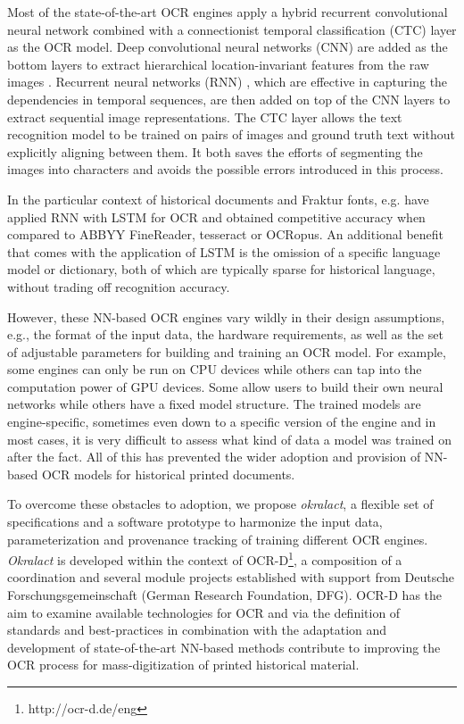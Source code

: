 \documentclass[conference]{IEEEtran}
\begin{document}
Most of the state-of-the-art OCR engines apply a hybrid recurrent convolutional
neural network combined with a connectionist temporal classification (CTC)
\cite{graves2006connectionist} layer as the OCR model. Deep convolutional
neural networks (CNN) \cite{krizhevsky2012imagenet} are added as the bottom
layers to extract hierarchical location-invariant features from the raw images
\cite{wick2018improving}. Recurrent neural networks (RNN)
\cite{mikolov2010recurrent}, which are effective in capturing the dependencies
in temporal sequences, are then added on top of the CNN layers to extract
sequential image representations. The CTC layer allows the text recognition
model to be trained on pairs of images and ground truth text without explicitly
aligning between them. It both saves the efforts of segmenting the images into
characters and avoids the possible errors introduced in this process.

In the particular context of historical documents and Fraktur fonts, e.g.
\cite{breuel2013high} have applied RNN with LSTM for OCR and obtained 
competitive accuracy when compared to ABBYY FineReader, tesseract or OCRopus. 
An additional benefit that comes with the application of LSTM is the omission 
of a specific language model or dictionary, both of which are typically sparse 
for historical language, without trading off recognition accuracy.\cite{ul2013can}


However, these NN-based OCR engines vary wildly in their design
assumptions, e.g., the format of the input data, the hardware
requirements, as well as the set of adjustable parameters for
building and training an OCR model. For example, some engines can
only be run on CPU devices while others can tap into the
computation power of GPU devices. Some allow users to build their
own neural networks while others have a fixed model structure. The
trained models are engine-specific, sometimes even down to a specific
version of the engine and in most cases, it is very difficult to
assess what kind of data a model was trained on after the fact. All
of this has prevented the wider adoption and provision of NN-based OCR models
for historical printed documents.

To overcome these obstacles to adoption, we propose
\textit{okralact}, a flexible set of specifications and a software
prototype to harmonize the input data, parameterization and
provenance tracking of training different OCR engines.
\textit{Okralact} is developed within the context of
OCR-D\footnote{http://ocr-d.de/eng}, a composition of a
coordination and several module projects established with support
from Deutsche Forschungsgemeinschaft (German Research Foundation,
DFG). OCR-D has the aim to examine available technologies for OCR and via the 
definition of standards and best-practices in combination with the adaptation and development of state-of-the-art NN-based methods contribute to improving the OCR process for mass-digitization of 
printed historical material.\cite{neudecker2019datech}  
\end{document}
